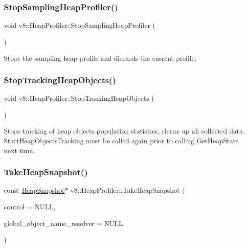 \subsubsection{\texorpdfstring{Stop\+Sampling\+Heap\+Profiler()}{StopSamplingHeapProfiler()}}
{\footnotesize\ttfamily void v8\+::\+Heap\+Profiler\+::\+Stop\+Sampling\+Heap\+Profiler (\begin{DoxyParamCaption}{ }\end{DoxyParamCaption})}

Stops the sampling heap profile and discards the current profile. \mbox{\label{classv8_1_1HeapProfiler_ae448d9474ae34781133d4a4547b08cb1}} 
\subsubsection{\texorpdfstring{Stop\+Tracking\+Heap\+Objects()}{StopTrackingHeapObjects()}}
{\footnotesize\ttfamily void v8\+::\+Heap\+Profiler\+::\+Stop\+Tracking\+Heap\+Objects (\begin{DoxyParamCaption}{ }\end{DoxyParamCaption})}

Stops tracking of heap objects population statistics, cleans up all collected data. Start\+Heap\+Objects\+Tracking must be called again prior to calling Get\+Heap\+Stats next time. \mbox{\label{classv8_1_1HeapProfiler_a4af9159585ab024175d8eff551804ea8}} 
\subsubsection{\texorpdfstring{Take\+Heap\+Snapshot()}{TakeHeapSnapshot()}}
{\footnotesize\ttfamily const \mbox{\hyperlink{classv8_1_1HeapSnapshot}{Heap\+Snapshot}}$\ast$ v8\+::\+Heap\+Profiler\+::\+Take\+Heap\+Snapshot (\begin{DoxyParamCaption}\item[{\mbox{\hyperlink{classv8_1_1ActivityControl}{Activity\+Control}} $\ast$}]{control = {\ttfamily NULL},  }\item[{\mbox{\hyperlink{classv8_1_1HeapProfiler_1_1ObjectNameResolver}{Object\+Name\+Resolver}} $\ast$}]{global\+\_\+object\+\_\+name\+\_\+resolver = {\ttfamily NULL} }\end{DoxyParamCaption})}

